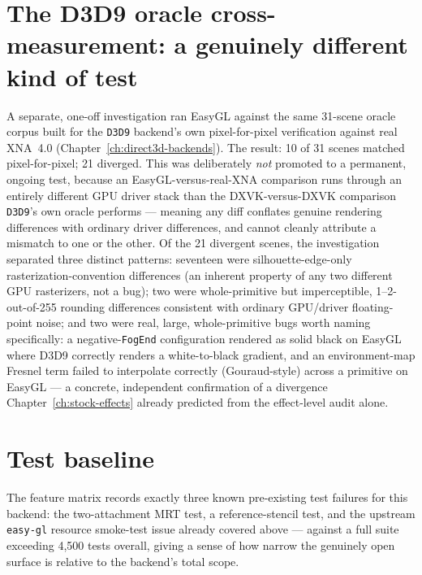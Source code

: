\section{The D3D9 oracle cross-measurement: a genuinely different kind of test}

A separate, one-off investigation ran EasyGL against the same 31-scene oracle corpus built
for the \texttt{D3D9} backend's own pixel-for-pixel verification against real XNA~4.0
(Chapter~\ref{ch:direct3d-backends}). The result: 10 of 31 scenes matched pixel-for-pixel;
21 diverged. This was deliberately \emph{not} promoted to a permanent, ongoing test, because
an EasyGL-versus-real-XNA comparison runs through an entirely different GPU driver stack than
the DXVK-versus-DXVK comparison \texttt{D3D9}'s own oracle performs --- meaning any diff
conflates genuine rendering differences with ordinary driver differences, and cannot cleanly
attribute a mismatch to one or the other. Of the 21 divergent scenes, the investigation
separated three distinct patterns: seventeen were silhouette-edge-only rasterization-convention
differences (an inherent property of any two different GPU rasterizers, not a bug);
two were whole-primitive but imperceptible, 1--2-out-of-255 rounding differences consistent
with ordinary GPU/driver floating-point noise; and two were real, large, whole-primitive
bugs worth naming specifically: a negative-\texttt{FogEnd} configuration rendered as solid
black on EasyGL where D3D9 correctly renders a white-to-black gradient, and an
environment-map Fresnel term failed to interpolate correctly (Gouraud-style) across a
primitive on EasyGL --- a concrete, independent confirmation of a divergence
Chapter~\ref{ch:stock-effects} already predicted from the effect-level audit alone.

\section{Test baseline}

The feature matrix records exactly three known pre-existing test failures for this backend:
the two-attachment MRT test, a reference-stencil test, and the upstream \texttt{easy-gl}
resource smoke-test issue already covered above --- against a full suite exceeding 4{,}500
tests overall, giving a sense of how narrow the genuinely open surface is relative to the
backend's total scope.
